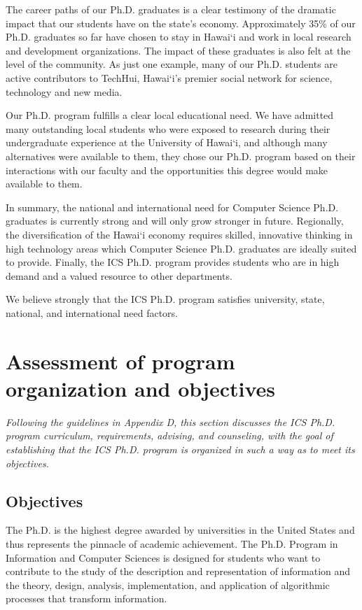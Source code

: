 \documentclass[12pt]{article}
\begin{document}
The career paths of our Ph.D. graduates is a clear testimony of the
dramatic impact that our students have on the state's
economy. Approximately 35\% of our Ph.D. graduates so far have chosen to
stay in Hawai`i and work in local research and development organizations.
The impact of these graduates is also felt at the level of the community.
As just one example, many of our Ph.D. students are active contributors to
TechHui, Hawai`i's premier social network for science, technology and new
media.

Our Ph.D. program fulfills a clear local educational need. We have admitted
many outstanding local students who were exposed to research
during their undergraduate experience at the University of Hawai`i, and
although many alternatives were available to them, they chose our
Ph.D. program based on their interactions with our faculty and the
opportunities this degree would make available to them.

In summary, the national and international need for Computer Science
Ph.D. graduates is currently strong and will only grow stronger in future.
Regionally, the diversification of the Hawai`i economy requires skilled,
innovative thinking in high technology areas which Computer Science
Ph.D. graduates are ideally suited to provide.  Finally, the ICS
Ph.D. program provides students who are in high demand and a valued
resource to other departments.   

We believe strongly that the ICS Ph.D. program satisfies university, state,
national, and international need factors. 

\section{Assessment of program organization and objectives}

{\em Following the guidelines in Appendix D, this section discusses the ICS
  Ph.D. program curriculum, requirements, advising, and counseling, with
  the goal of establishing that the ICS Ph.D. program is organized in such
  a way as to meet its objectives. }

\subsection{Objectives}

The Ph.D. is the highest degree awarded by universities in the United
States and thus represents the pinnacle of academic achievement.  The Ph.D.
Program in Information and Computer Sciences is designed for students who
want to contribute to the study of the description and representation of
information and the theory, design, analysis, implementation, and
application of algorithmic processes that transform information.
\end{document}
